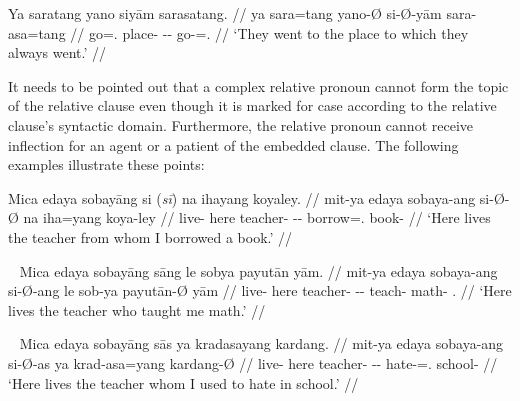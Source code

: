 \a\label{ex:reldat}\begingl
	\gla Ya saratang yano siyām sarasatang. //
	\glb ya sara=tang yano-Ø si-Ø-yām sara-asa=tang //
	\glc \LocT{} go=\TplM{}.\Aarg{} place-\Top{} \Rel{}-\Loc{}-\Dat{} 
		go-\Hab{}=\TplM{}.\Aarg{} //
	\glft `They went to the place to which they always went.' //
\endgl
\xe

It needs to be pointed out that a complex relative pronoun cannot form the
topic of the relative clause even though it is marked for case according to the
relative clause's syntactic domain. Furthermore, the relative pronoun cannot
receive inflection for an agent or a patient of the embedded clause. The
following examples illustrate these points:

\pex\label{ex:reltop}
\ljudge* \begingl
	\gla Mica edaya sobayāng {si \textup{(\ques{}\textit{sī})}} na ihayang 
		koyaley. //
	\glb mit-ya edaya sobaya-ang si-Ø-Ø na iha=yang koya-ley //
	\glc live-\TsgM{} here teacher-\Aarg{} \Rel{}-\Aarg{}-\Top{} \GenT{} 
		borrow=\Fsg{}.\Aarg{} book-\PargI{} //
% 
	\glft `Here lives the teacher from whom I borrowed a book.' //
\endgl
\xe

\pex~\label{ex:relagt}
\ljudge* \begingl
	\gla Mica edaya sobayāng sāng le sobya payutān yām. //
	\glb mit-ya edaya sobaya-ang si-Ø-ang le sob-ya payutān-Ø yām //
	\glc live-\TsgM{} here teacher-\Aarg{} \Rel{}-\Aarg{}-\Aarg{} \PatTI{} 
		teach-\TsgM{} math-\Top{} \Fsg{}.\Dat{} //
% 
	\glft `Here lives the teacher who taught me math.' //
\endgl
\xe

\pex~\label{ex:relpat}
\ljudge* \begingl
	\gla Mica edaya sobayāng sās ya kradasayang kardang. //
	\glb mit-ya edaya sobaya-ang si-Ø-as ya krad-asa=yang kardang-Ø //
	\glc live-\TsgM{} here teacher-\Aarg{} \Rel{}-\Aarg{}-\Parg{} \LocT{}
		hate-\Hab{}=\Fsg{}.\Aarg{} school-\Top{} //
% 
	\glft `Here lives the teacher whom I used to hate in school.' //
\endgl
\xe


